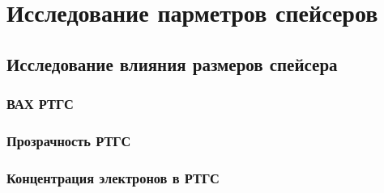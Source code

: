 





\section{Исследование парметров спейсеров}

\subsection{Исследование влияния размеров спейсера}
\subsubsection{ВАХ РТГС}
\subsubsection{Прозрачность РТГС}
\subsubsection{Концентрация электронов в РТГС}